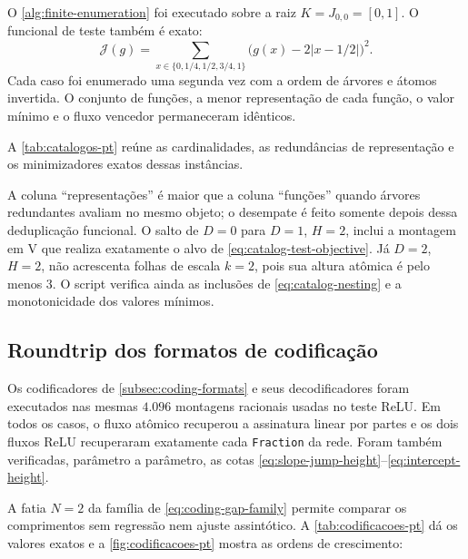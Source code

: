 O \cref{alg:finite-enumeration} foi executado sobre a raiz
$K=J_{0,0}=[0,1]$. O funcional de teste também é exato:
\begin{equation}
 \mathcal J(g)=\sum_{x\in\{0,1/4,1/2,3/4,1\}}
 \bigl(g(x)-2|x-1/2|\bigr)^2.
 \label{eq:catalog-test-objective}
\end{equation}
Cada caso foi enumerado uma segunda vez com a ordem de árvores e átomos
invertida. O conjunto de funções, a menor representação de cada função, o
valor mínimo e o fluxo vencedor permaneceram idênticos.

A \cref{tab:catalogos-pt} reúne as cardinalidades, as redundâncias de
representação e os minimizadores exatos dessas instâncias.

\begin{table}[t]
\centering
\caption{Enumeração e minimização exatas em
$\Sigma_{D,H}^{\Library}([0,1])$.}
\label{tab:catalogos-pt}
\small

\end{table}

A coluna ``representações'' é maior que a coluna ``funções'' quando árvores
redundantes avaliam no mesmo objeto; o desempate é feito somente depois dessa
deduplicação funcional. O salto de $D=0$ para $D=1$, $H=2$, inclui a montagem
em V que realiza exatamente o alvo de \eqref{eq:catalog-test-objective}. Já
$D=2$, $H=2$, não acrescenta folhas de escala $k=2$, pois sua altura atômica é
pelo menos $3$. O script verifica ainda as inclusões de
\eqref{eq:catalog-nesting} e a monotonicidade dos valores mínimos.

\subsection{Roundtrip dos formatos de codificação}

Os codificadores de \cref{subsec:coding-formats} e seus decodificadores foram
executados nas mesmas $4.096$ montagens racionais usadas no teste ReLU. Em
todos os casos, o fluxo atômico recuperou a assinatura linear por partes e os
dois fluxos ReLU recuperaram exatamente cada \texttt{Fraction} da rede. Foram
também verificadas, parâmetro a parâmetro, as cotas
\eqref{eq:slope-jump-height}--\eqref{eq:intercept-height}.

A fatia $N=2$ da família de \eqref{eq:coding-gap-family} permite comparar os
comprimentos sem regressão nem ajuste assintótico. A
\cref{tab:codificacoes-pt} dá os valores exatos e a
\cref{fig:codificacoes-pt} mostra as ordens de crescimento:
\begin{table}[t]
\centering
\caption{Comprimentos exatos dos três fluxos prefix-free na família crítica.}
\label{tab:codificacoes-pt}
\small

\end{table}

